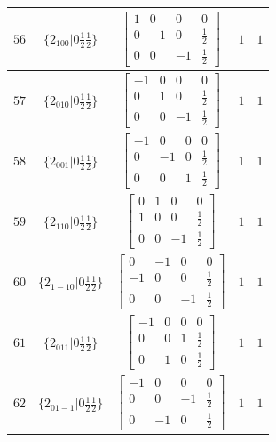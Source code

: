 \documentclass[fleqn,8pt]{jsarticle}
\begin{document}
\begin{longtable}{ccccc}
$ 56 $ & $ \{2{}_{100}|0 \frac{1}{2} \frac{1}{2}\} $ & $ \begin{bmatrix} 1 & 0 & 0 & 0 \\ 0 & -1 & 0 & \frac{1}{2} \\ 0 & 0 & -1 & \frac{1}{2} \end{bmatrix} $ & $ 1 $ & $ 1 $ \\ \hline
$ 57 $ & $ \{2{}_{010}|0 \frac{1}{2} \frac{1}{2}\} $ & $ \begin{bmatrix} -1 & 0 & 0 & 0 \\ 0 & 1 & 0 & \frac{1}{2} \\ 0 & 0 & -1 & \frac{1}{2} \end{bmatrix} $ & $ 1 $ & $ 1 $ \\ \hline
$ 58 $ & $ \{2{}_{001}|0 \frac{1}{2} \frac{1}{2}\} $ & $ \begin{bmatrix} -1 & 0 & 0 & 0 \\ 0 & -1 & 0 & \frac{1}{2} \\ 0 & 0 & 1 & \frac{1}{2} \end{bmatrix} $ & $ 1 $ & $ 1 $ \\ \hline
$ 59 $ & $ \{2{}_{110}|0 \frac{1}{2} \frac{1}{2}\} $ & $ \begin{bmatrix} 0 & 1 & 0 & 0 \\ 1 & 0 & 0 & \frac{1}{2} \\ 0 & 0 & -1 & \frac{1}{2} \end{bmatrix} $ & $ 1 $ & $ 1 $ \\ \hline
$ 60 $ & $ \{2{}_{1-10}|0 \frac{1}{2} \frac{1}{2}\} $ & $ \begin{bmatrix} 0 & -1 & 0 & 0 \\ -1 & 0 & 0 & \frac{1}{2} \\ 0 & 0 & -1 & \frac{1}{2} \end{bmatrix} $ & $ 1 $ & $ 1 $ \\ \hline
$ 61 $ & $ \{2{}_{011}|0 \frac{1}{2} \frac{1}{2}\} $ & $ \begin{bmatrix} -1 & 0 & 0 & 0 \\ 0 & 0 & 1 & \frac{1}{2} \\ 0 & 1 & 0 & \frac{1}{2} \end{bmatrix} $ & $ 1 $ & $ 1 $ \\ \hline
$ 62 $ & $ \{2{}_{01-1}|0 \frac{1}{2} \frac{1}{2}\} $ & $ \begin{bmatrix} -1 & 0 & 0 & 0 \\ 0 & 0 & -1 & \frac{1}{2} \\ 0 & -1 & 0 & \frac{1}{2} \end{bmatrix} $ & $ 1 $ & $ 1 $ \\ \hline

\end{longtable}
\end{document}
